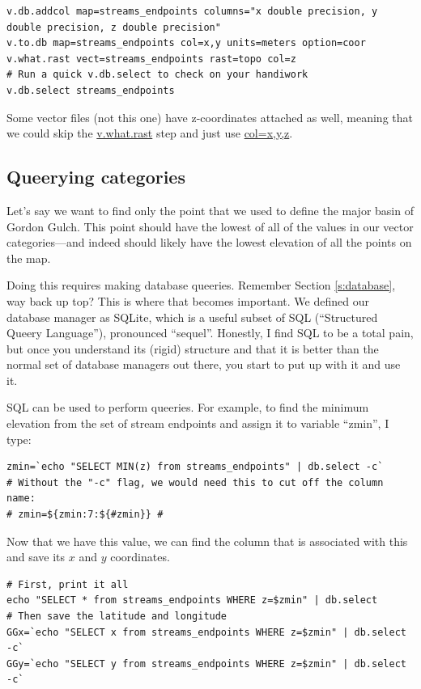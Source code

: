 \documentclass{book}
\begin{document}
\begin{lstlisting}
v.db.addcol map=streams_endpoints columns="x double precision, y double precision, z double precision"
v.to.db map=streams_endpoints col=x,y units=meters option=coor
v.what.rast vect=streams_endpoints rast=topo col=z
# Run a quick v.db.select to check on your handiwork
v.db.select streams_endpoints
\end{lstlisting}

Some vector files (not this one) have z-coordinates attached as well, meaning that we could skip the \url{v.what.rast} step and just use \url{col=x,y,z}.

\subsection{Queerying categories}

Let's say we want to find only the point that we used to define the major basin of Gordon Gulch. This point should have the lowest of all of the values in our vector categories---and indeed should likely have the lowest elevation of all the points on the map.

Doing this requires making database queeries. Remember Section \ref{s:database}, way back up top? This is where that becomes important. We defined our database manager as SQLite, which is a useful subset of SQL (``Structured Queery Language''), pronounced ``sequel''. Honestly, I find SQL to be a total pain, but once you understand its (rigid) structure and that it is better than the normal set of database managers out there, you start to put up with it and use it.

SQL can be used to perform queeries. For example, to find the minimum elevation from the set of stream endpoints and assign it to variable ``zmin'', I type:

\begin{lstlisting}
zmin=`echo "SELECT MIN(z) from streams_endpoints" | db.select -c`
# Without the "-c" flag, we would need this to cut off the column name:
# zmin=${zmin:7:${#zmin}} # 
\end{lstlisting}

Now that we have this value, we can find the column that is associated with this and save its $x$ and $y$ coordinates.

\begin{lstlisting}
# First, print it all
echo "SELECT * from streams_endpoints WHERE z=$zmin" | db.select
# Then save the latitude and longitude
GGx=`echo "SELECT x from streams_endpoints WHERE z=$zmin" | db.select -c`
GGy=`echo "SELECT y from streams_endpoints WHERE z=$zmin" | db.select -c`
\end{lstlisting}
\end{document}
